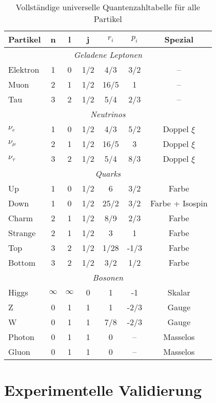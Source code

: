 \documentclass[12pt,a4paper]{article}
\begin{document}
\begin{table}[H]
	\centering
	\begin{tabular}{lcccccc}
		\toprule
		\textbf{Partikel} & \textbf{n} & \textbf{l} & \textbf{j} & \textbf{$r_i$} & \textbf{$p_i$} & \textbf{Spezial} \\
		\midrule
		\multicolumn{7}{c}{\textit{Geladene Leptonen}} \\
		\midrule
		Elektron & 1 & 0 & 1/2 & 4/3 & 3/2 & -- \\
		Muon & 2 & 1 & 1/2 & 16/5 & 1 & -- \\
		Tau & 3 & 2 & 1/2 & 5/4 & 2/3 & -- \\
		\midrule
		\multicolumn{7}{c}{\textit{Neutrinos}} \\
		\midrule
		$\nu_e$ & 1 & 0 & 1/2 & 4/3 & 5/2 & Doppel $\xi$ \\
		$\nu_\mu$ & 2 & 1 & 1/2 & 16/5 & 3 & Doppel $\xi$ \\
		$\nu_\tau$ & 3 & 2 & 1/2 & 5/4 & 8/3 & Doppel $\xi$ \\
		\midrule
		\multicolumn{7}{c}{\textit{Quarks}} \\
		\midrule
		Up & 1 & 0 & 1/2 & 6 & 3/2 & Farbe \\
		Down & 1 & 0 & 1/2 & 25/2 & 3/2 & Farbe + Isospin \\
		Charm & 2 & 1 & 1/2 & 8/9 & 2/3 & Farbe \\
		Strange & 2 & 1 & 1/2 & 3 & 1 & Farbe \\
		Top & 3 & 2 & 1/2 & 1/28 & -1/3 & Farbe \\
		Bottom & 3 & 2 & 1/2 & 3/2 & 1/2 & Farbe \\
		\midrule
		\multicolumn{7}{c}{\textit{Bosonen}} \\
		\midrule
		Higgs & $\infty$ & $\infty$ & 0 & 1 & -1 & Skalar \\
		Z & 0 & 1 & 1 & 1 & -2/3 & Gauge \\
		W & 0 & 1 & 1 & 7/8 & -2/3 & Gauge \\
		Photon & 0 & 1 & 1 & 0 & -- & Masselos \\
		Gluon & 0 & 1 & 1 & 0 & -- & Masselos \\
		\bottomrule
	\end{tabular}
	\caption{Vollst\"a{}ndige universelle Quantenzahltabelle f\"ur alle Partikel}
	\label{tab:universal_quantum_numbers}
\end{table}

\section{Experimentelle Validierung}
\label{sec:experimental_validation}
\end{document}
